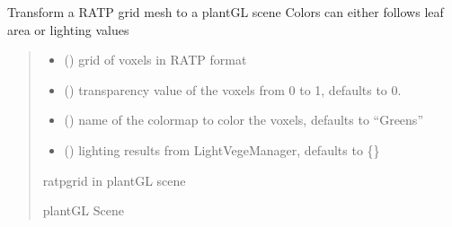 \documentclass[letterpaper,10pt,english]{sphinxmanual}
\begin{document}

\begin{fulllineitems}
\label{\detokenize{reference:plantGL.ratpgrid_to_plantGLScene}}
\pysigstartsignatures
{}
\pysigstopsignatures
\sphinxAtStartPar
Transform a RATP grid mesh to a plantGL scene
Colors can either follows leaf area or lighting values
\begin{quote}\begin{description}
\begin{itemize}
\item {} 
\sphinxAtStartPar
{} () \textendash{} grid of voxels in RATP format

\item {} 
\sphinxAtStartPar
{} (\sphinxstyleliteralemphasis{\sphinxupquote{, }}) \textendash{} transparency value of the voxels from 0 to 1, defaults to 0.

\item {} 
\sphinxAtStartPar
{} (\sphinxstyleliteralemphasis{\sphinxupquote{, }}) \textendash{} name of the colormap to color the voxels, defaults to “Greens”

\item {} 
\sphinxAtStartPar
{} (\sphinxstyleliteralemphasis{\sphinxupquote{, }}) \textendash{} lighting results from LightVegeManager, defaults to \{\}

\end{itemize}

\sphinxAtStartPar
ratpgrid in plantGL scene

\sphinxAtStartPar
plantGL Scene

\end{description}\end{quote}

\end{fulllineitems}
\end{document}
